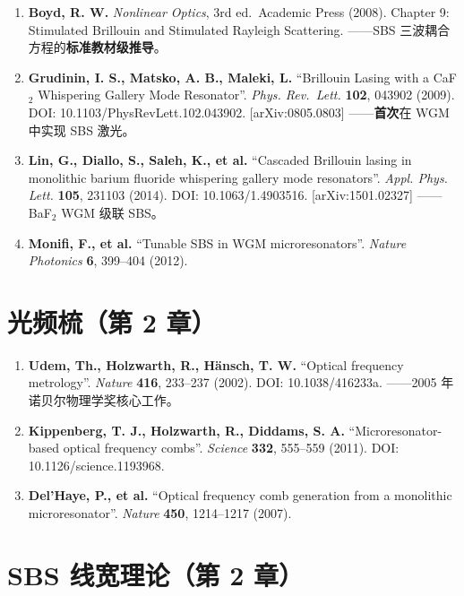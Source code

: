 \documentclass[
  11pt,
  a4paper,
]{ctexrep}
\begin{document}
\begin{enumerate}
\def\labelenumi{\arabic{enumi}.}
\item
  \textbf{Boyd, R. W.} \emph{Nonlinear Optics}, 3rd ed.~Academic Press
  (2008). Chapter 9: Stimulated Brillouin and Stimulated Rayleigh
  Scattering. ------SBS 三波耦合方程的\textbf{标准教材级推导}。
\item
  \textbf{Grudinin, I. S., Matsko, A. B., Maleki, L.} ``Brillouin Lasing
  with a CaF\(_2\) Whispering Gallery Mode Resonator''. \emph{Phys.
  Rev.~Lett.} \textbf{102}, 043902 (2009). DOI:
  10.1103/PhysRevLett.102.043902. {[}arXiv:0805.0803{]}
  ------\textbf{首次}在 WGM 中实现 SBS 激光。
\item
  \textbf{Lin, G., Diallo, S., Saleh, K., et al.} ``Cascaded Brillouin
  lasing in monolithic barium fluoride whispering gallery mode
  resonators''. \emph{Appl. Phys. Lett.} \textbf{105}, 231103 (2014).
  DOI: 10.1063/1.4903516. {[}arXiv:1501.02327{]} ------BaF\(_2\) WGM
  级联 SBS。
\item
  \textbf{Monifi, F., et al.} ``Tunable SBS in WGM microresonators''.
  \emph{Nature Photonics} \textbf{6}, 399--404 (2012).
\end{enumerate}

\section*{光频梳（第 2 章）}\label{ux5149ux9891ux68b3ux7b2c-2-ux7ae0}


\begin{enumerate}
\def\labelenumi{\arabic{enumi}.}
\setcounter{enumi}{4}
\item
  \textbf{Udem, Th., Holzwarth, R., Hänsch, T. W.} ``Optical frequency
  metrology''. \emph{Nature} \textbf{416}, 233--237 (2002). DOI:
  10.1038/416233a. ------2005 年诺贝尔物理学奖核心工作。
\item
  \textbf{Kippenberg, T. J., Holzwarth, R., Diddams, S. A.}
  ``Microresonator-based optical frequency combs''. \emph{Science}
  \textbf{332}, 555--559 (2011). DOI: 10.1126/science.1193968.
\item
  \textbf{Del'Haye, P., et al.} ``Optical frequency comb generation from
  a monolithic microresonator''. \emph{Nature} \textbf{450}, 1214--1217
  (2007).
\end{enumerate}

\section*{SBS 线宽理论（第 2
章）}\label{sbs-ux7ebfux5bbdux7406ux8bbaux7b2c-2-ux7ae0}
\end{document}
